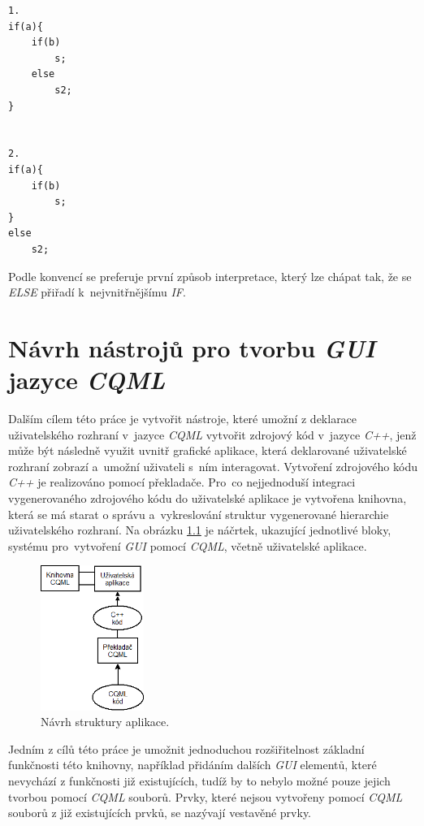 \documentclass[11pt,twoside,a4paper]{book}
\begin{document}
\begin{lstlisting}[float,frame=single,caption=Možnosti interpretace víceznačného výroku \textit{IF}-\textit{ELSE},label=lst:if3]
1.
if(a){
	if(b)
		s;
	else
		s2;
}


2.
if(a){
	if(b)
		s;
}
else
	s2;
\end{lstlisting}
Podle konvencí se preferuje první způsob interpretace, který lze chápat tak, že se \textit{ELSE} přiřadí k~nejvnitřnějšímu \textit{IF}.


\chapter[Návrh nástrojů]{\label{CH:appDesign}Návrh nástrojů pro tvorbu \textit{GUI} jazyce \textit{CQML}}
Dalším cílem této práce je vytvořit nástroje, které umožní z deklarace uživatelského rozhraní v~jazyce \textit{CQML} vytvořit zdrojový kód v~jazyce \textit{C++}, jenž může být následně využit uvnitř grafické aplikace, která deklarované uživatelské rozhraní zobrazí a~umožní uživateli s~ním interagovat. Vytvoření zdrojového kódu \textit{C++} je realizováno pomocí překladače. Pro~co nejjednoduší integraci vygenerovaného zdrojového kódu do uživatelské aplikace je vytvořena knihovna, která se má starat o správu a~vykreslování struktur vygenerované hierarchie uživatelského rozhraní. Na obrázku \ref{fig:structure1} je náčrtek, ukazující jednotlivé bloky, systému pro~vytvoření \textit{GUI} pomocí \textit{CQML}, včetně uživatelské aplikace. \\
\begin{figure}[!ht]
\begin{center}
  \includegraphics[width=0.30\textwidth]{figures/Diagram1}
\caption{{\label{fig:structure1}}Návrh struktury aplikace.}
\end{center}
\end{figure}
Jedním z cílů této práce je umožnit jednoduchou rozšiřitelnost základní funkčnosti této knihovny, například přidáním dalších \textit{GUI} elementů, které nevychází z funkčnosti již existujících, tudíž by to nebylo možné pouze jejich tvorbou pomocí \textit{CQML} souborů. Prvky, které nejsou vytvořeny pomocí \textit{CQML} souborů z již existujících prvků, se nazývají vestavěné prvky.\\
\end{document}

